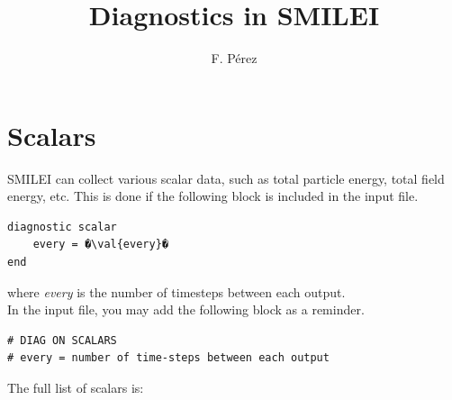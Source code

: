 \documentclass[11pt]{article}
\newcommand{\val}[1]{{\ttfamily \textit{#1}}}
\begin{document}
\title{Diagnostics in SMILEI}
\author{F. P\'erez}
\maketitle

\setcounter{tocdepth}{2}
\tableofcontents

\clearpage


\section{Scalars\label{sec:scalars}}

SMILEI can collect various scalar data, such as total particle energy, total field energy, etc.
This is done if the following block is included in the input file.

\begin{lstlisting}
diagnostic scalar
	every = �\val{every}�
end
\end{lstlisting}
where \val{every} is the number of timesteps between each output.\\
\vfill
In the input file, you may add the following block as a reminder.
\begin{lstlisting}
# DIAG ON SCALARS
# every = number of time-steps between each output
\end{lstlisting}
\vfill
The full list of scalars is:\\
\end{document}
